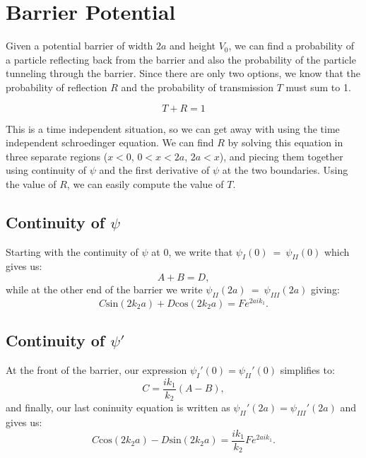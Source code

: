 \section{Barrier Potential}

Given a potential barrier of width $2a$ and height $V_0$, we can find a probability of a particle reflecting back from the barrier and also the probability of the particle tunneling through the barrier. Since there are only two options, we know that the probability of reflection $R$ and the probability of transmission $T$ must sum to 1.

$$T + R = 1$$

This is a time independent situation, so we can get away with using the time independent schroedinger equation. We can find $R$ by solving this equation in three separate regions ($x < 0$, $0 < x < 2a$, $2a < x$), and piecing them together using continuity of $\psi$ and the first derivative of $\psi$ at the two boundaries. Using the value of $R$, we can easily compute the value of $T$. 

\subsection{Continuity of $\psi$}

Starting with the continuity of $\psi$ at 0, we write that $\psi_I(0)~=~\psi_{II}(0)$ which gives us:  
\begin{equation}
A + B = D,
\label{front}
\end{equation}
while at the other end of the barrier we write $\psi_{II}(2a)~=~\psi_{III}(2a)$ giving:
\begin{equation}
C \mathrm{sin}(2 k_2 a) + D \mathrm{cos}(2 k_2 a) = F e^{2a i k_1}.
\label{end}
\end{equation}



\subsection{Continuity of $\psi'$}

At the front of the barrier, our expression $\psi_I'(0) = \psi_{II}'(0)$ simplifies to:
\begin{equation}
C = \frac{i k_1}{k_2}(A-B),
\label{frontp}
\end{equation}
and finally, our last coninuity equation is written as $\psi_{II}'(2a) = \psi_{III}'(2a)$ and gives us:  
\begin{equation}
C \mathrm{cos}(2 k_2 a) - D \mathrm{sin}(2 k_2 a) =\frac{i k_1}{k_2} F e^{2a i k_1}.
\label{endp}
\end{equation}
 
